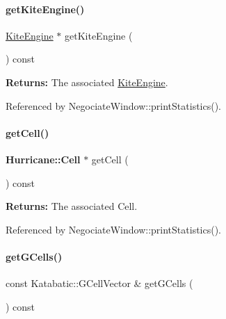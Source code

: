 \paragraph{\texorpdfstring{get\+Kite\+Engine()}{getKiteEngine()}}
{\footnotesize\ttfamily \mbox{\hyperlink{classKite_1_1KiteEngine}{Kite\+Engine}} $\ast$ get\+Kite\+Engine (\begin{DoxyParamCaption}{ }\end{DoxyParamCaption}) const\hspace{0.3cm}{\ttfamily [inline]}}

{\bfseries Returns\+:} The associated \mbox{\hyperlink{classKite_1_1KiteEngine}{Kite\+Engine}}. 

Referenced by Negociate\+Window\+::print\+Statistics().

\mbox{\label{classKite_1_1NegociateWindow_a5ea0f667687d3a832f8c9806ccbe6792}} 
\paragraph{\texorpdfstring{get\+Cell()}{getCell()}}
{\footnotesize\ttfamily \textbf{ Hurricane\+::\+Cell} $\ast$ get\+Cell (\begin{DoxyParamCaption}{ }\end{DoxyParamCaption}) const}

{\bfseries Returns\+:} The associated Cell. 

Referenced by Negociate\+Window\+::print\+Statistics().

\mbox{\label{classKite_1_1NegociateWindow_ad8902daa6817d4275be5e3a37eb24424}} 
\paragraph{\texorpdfstring{get\+G\+Cells()}{getGCells()}}
{\footnotesize\ttfamily const Katabatic\+::\+G\+Cell\+Vector \& get\+G\+Cells (\begin{DoxyParamCaption}{ }\end{DoxyParamCaption}) const\hspace{0.3cm}{\ttfamily [inline]}}


